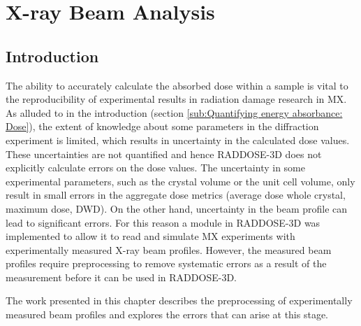 \chapter{X-ray Beam Analysis}
\label{chap:X-ray Beam Analysis}

\section{Introduction}
\label{sec:Introduction - Beam chapter}
The ability to accurately calculate the absorbed dose within a sample is vital to the reproducibility of experimental results in radiation damage research in MX.
As alluded to in the introduction (section \ref{sub:Quantifying energy absorbance: Dose}), the extent of knowledge about some parameters in the diffraction experiment is limited, which results in uncertainty in the calculated dose values.
These uncertainties are not quantified and hence RADDOSE-3D does not explicitly calculate errors on the dose values.
The uncertainty in some experimental parameters, such as the crystal volume or the unit cell volume, only result in small errors in the aggregate dose metrics (average dose whole crystal, maximum dose, DWD).
On the other hand, uncertainty in the beam profile can lead to significant errors.
For this reason a module in RADDOSE-3D was implemented to allow it to read and simulate MX experiments with experimentally measured X-ray beam profiles.
However, the measured beam profiles require preprocessing to remove systematic errors as a result of the measurement before it can be used in RADDOSE-3D.

The work presented in this chapter describes the preprocessing of experimentally measured beam profiles and explores the errors that can arise at this stage.
